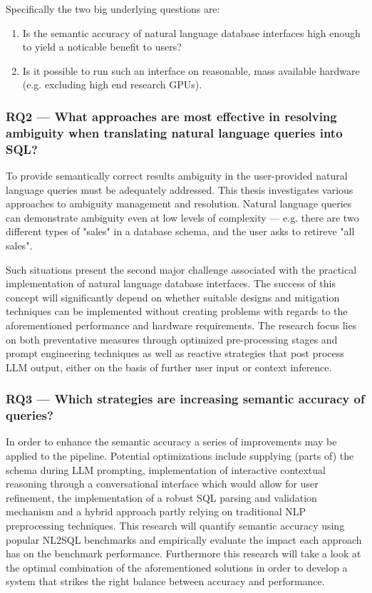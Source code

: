 \documentclass{article}
\begin{document}
Specifically the two big underlying questions are:

\begin{enumerate}
    \item Is the semantic accuracy of natural language database interfaces high enough to yield a noticable
          benefit to users?
    \item Is it possible to run such an interface on reasonable, mass available hardware (e.g. excluding high end research GPUs).
\end{enumerate}

\subsubsection*{RQ2 — What approaches are most effective in resolving ambiguity when translating natural language queries into SQL?}

To provide semantically correct results ambiguity in the user-provided natural language queries must be 
adequately addressed. This thesis investigates various approaches to ambiguity management and
resolution. Natural language queries can demonstrate ambiguity even at low levels of complexity —
e.g. there are two different types of "sales" in a database schema, and the user asks to retireve
"all sales".

Such situations present the second major challenge associated with the practical implementation of natural
language database interfaces. The success of this concept will significantly depend on whether suitable 
designs and mitigation techniques can be implemented without creating problems with regards to the 
aforementioned performance and hardware requirements. The research focus lies on both preventative measures
through optimized pre-processing stages and prompt engineering techniques as well as reactive strategies
that post process LLM output, either on the basis of further user input or context inference.

\subsubsection*{RQ3 — Which strategies are increasing semantic accuracy of queries?}

In order to enhance the semantic accuracy a series of improvements may be applied to the pipeline.
Potential optimizations include supplying (parts of) the schema during LLM prompting, implementation of
interactive contextual reasoning through a conversational interface which would allow for user
refinement, the implementation of a robust SQL parsing and validation mechanism and a hybrid approach
partly relying on traditional NLP preprocessing techniques. This research will quantify semantic accuracy
using popular NL2SQL benchmarks and empirically evaluate the impact each approach has on the benchmark
performance. Furthermore this research will take a look at the optimal combination of the aforementioned
solutions in order to develop a system that strikes the right balance between accuracy and performance.
\end{document}
